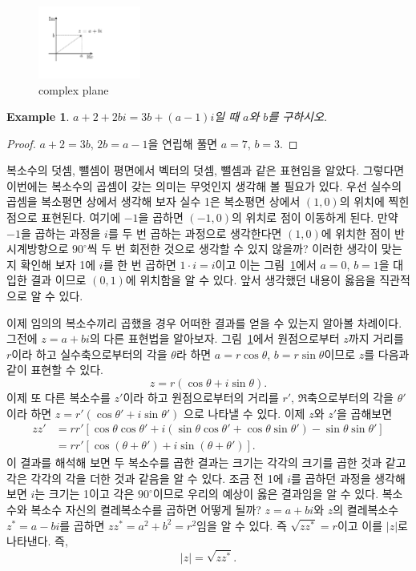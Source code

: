 \documentclass[a4paper, nobookmarks, subfigure, adjustmath, amsmath]{oblivoir}
\newcommand{\myfig}{그림~}
\newtheorem{example}{Example}
\begin{document}
\begin{figure}[!hbp]
\centering
\includegraphics[width=0.3\textwidth]{complexPlane}
\caption{\label{complexPlane}complex plane}
\end{figure}

\begin{example}
$a+2+2bi = 3b+(a-1)i$일 때 $a$와 $b$를 구하시오.
\end{example}
\begin{proof}
$a+2 = 3b$, $2b = a-1$을 연립해 풀면 $a = 7$, $b = 3$.
\end{proof}

복소수의 덧셈, 뺄셈이 평면에서 벡터의 덧셈, 뺄셈과 같은 표현임을 알았다. 그렇다면 이번에는 복소수의 곱셈이 갖는 의미는 무엇인지 생각해 볼 필요가 있다. 우선 실수의 곱셈을 복소평면 상에서 생각해 보자 실수 1은 복소평면 상에서 $(1,0)$의 위치에 찍힌 점으로 표현된다. 여기에 $-1$을 곱하면 $(-1,0)$의 위치로 점이 이동하게 된다. 만약 $-1$을 곱하는 과정을 $i$를 두 번 곱하는 과정으로 생각한다면 $(1,0)$에 위치한 점이 반시계방향으로 $90^{\circ}$씩 두 번 회전한 것으로 생각할 수 있지 않을까? 이러한 생각이 맞는지 확인해 보자 1에 $i$를 한 번 곱하면 $1\cdot i = i$이고 이는 \myfig\ref{complexPlane}에서 $a = 0$, $b = 1$을 대입한 결과 이므로 $(0,1)$에 위치함을 알 수 있다. 앞서 생각했던 내용이 옳음을 직관적으로 알 수 있다.

이제 임의의 복소수끼리 곱했을 경우 어떠한 결과를 얻을 수 있는지 알아볼 차례이다. 그전에 $z = a+bi$의 다른 표현법을 알아보자. \myfig\ref{complexPlane}에서 원점으로부터 $z$까지 거리를 $r$이라 하고 실수축으로부터의 각을 $\theta$라 하면 $a = r \cos \theta$, $b = r \sin \theta$이므로 $z$를 다음과 같이 표현할 수 있다.
\begin{equation}
z = r(\cos\theta + i \sin\theta).
\end{equation}
이제 또 다른 복소수를 $z'$이라 하고 원점으로부터의 거리를 $r'$, $\Re$축으로부터의 각을 $\theta '$이라 하면 $z = r'(\cos\theta ' + i \sin\theta ')$ 으로 나타낼 수 있다. 이제 $z$와 $z'$을 곱해보면
\begin{align}
zz' &= rr' \left[ \cos\theta \cos\theta ' + i(\sin\theta \cos\theta ' + \cos\theta \sin\theta ') - \sin\theta \sin\theta ' \right]\nonumber
\\ &= rr' \left[ \cos (\theta+\theta ') + i \sin (\theta + \theta ') \right].
\end{align}
이 결과를 해석해 보면 두 복소수를 곱한 결과는 크기는 각각의 크기를 곱한 것과 같고 각은 각각의 각을 더한 것과 같음을 알 수 있다. 조금 전 1에 $i$를 곱하던 과정을 생각해 보면 $i$는 크기는 1이고 각은 $90^{\circ}$이므로 우리의 예상이 옳은 결과임을 알 수 있다. 복소수와 복소수 자신의 켤레복소수를 곱하면 어떻게 될까? $z = a+bi$와 $z$의 켤레복소수 $z^{\ast} = a-bi$를 곱하면 $zz^{\ast} = a^2 + b^2 = r^2$임을 알 수 있다. 즉 $\sqrt{zz^{\ast}} = r$이고 이를 $|z|$로 나타낸다. 즉,
\begin{equation}
|z| = \sqrt{zz^{\ast}}.
\end{equation}
\end{document}
